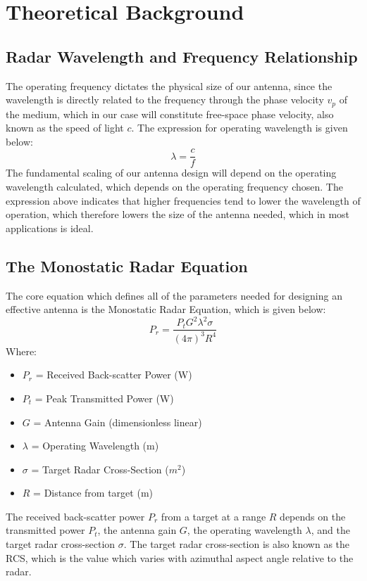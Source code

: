 \documentclass[a4paper]{article}
\begin{document}
\section{Theoretical Background}
	\subsection{Radar Wavelength and Frequency Relationship}
	The operating frequency dictates the physical size of our antenna, since the wavelength is directly related to the frequency through the phase velocity $v_p$ of the medium, which in our case will constitute free-space phase velocity, also known as the speed of light $c$. The expression for operating wavelength is given below: 
	\begin{equation}
		\lambda = \frac{c}{f}
	\end{equation}
	The fundamental scaling of our antenna design will depend on the operating wavelength calculated, which depends on the operating frequency chosen. The expression above indicates that higher frequencies tend to lower the wavelength of operation, which therefore lowers the size of the antenna needed, which in most applications is ideal.
	
	\subsection{The Monostatic Radar Equation}
	The core equation which defines all of the parameters needed for designing an effective antenna is the Monostatic Radar Equation, which is given below:
	\begin{equation}
		P_r = \frac{P_t G^2 \lambda^2 \sigma}{(4\pi)^3 R^4}
	\end{equation}
	Where:
	\begin{itemize}
		\item $P_r$ = Received Back-scatter Power (W)
		\item $P_t$ = Peak Transmitted Power (W)
		\item $G$ = Antenna Gain (dimensionless linear)
		\item $\lambda$ = Operating Wavelength (m)
		\item $\sigma$ = Target Radar Cross-Section ($m^2$)
		\item $R$ = Distance from target (m)
	\end{itemize}
	The received back-scatter power $P_r$ from a target at a range $R$ depends on the transmitted power $P_t$, the antenna gain $G$, the operating wavelength $\lambda$, and the target radar cross-section $\sigma$. The target radar cross-section is also known as the RCS, which is the value which varies with azimuthal aspect angle relative to the radar. 
	
\end{document}
